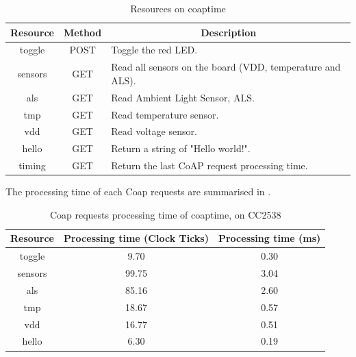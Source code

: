 \begin{table}[ht!]
	\center
	\begin{tabular}{|c|c|l|}
		\hline
		Resource & Method & \multicolumn{1}{c|}{Description}                          \\ \hline
		toggle   & POST   & Toggle the red LED.                                       \\ \hline
		sensors  & GET    & Read all sensors on the board (VDD, temperature and ALS). \\ \hline
		als      & GET    & Read Ambient Light Sensor, ALS.                           \\ \hline
		tmp      & GET    & Read temperature sensor.                                  \\ \hline
		vdd      & GET    & Read voltage sensor.                                      \\ \hline
		hello    & GET    & Return a string of "Hello world!".                        \\ \hline
		timing   & GET    & Return the last CoAP request processing time.             \\ \hline
	\end{tabular}
	\caption{Resources on coaptime}
	\label{Tbl: Resources on coaptime}
\end{table}

The processing time of each Coap requests are summarised in .

\begin{table}
	\center
	\begin{tabular}{|c|c|c|}
		\hline
		Resource & Processing time (Clock Ticks) & Processing time (ms) \\ \hline
		toggle   & 9.70                          & 0.30                 \\ \hline
		sensors  & 99.75                         & 3.04                 \\ \hline
		als      & 85.16                         & 2.60                 \\ \hline
		tmp      & 18.67                         & 0.57                 \\ \hline
		vdd      & 16.77                         & 0.51                 \\ \hline
		hello    & 6.30                          & 0.19                 \\ \hline
	\end{tabular}
	\caption{Coap requests processing time of coaptime, on CC2538}
	\label{Tbl: Coap requests processing time of coaptime}
\end{table}

